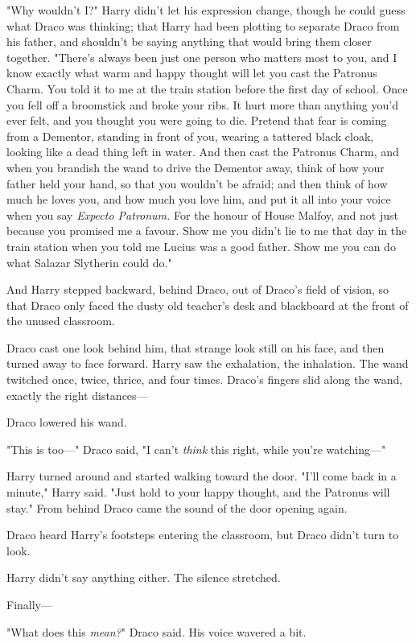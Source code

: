 "Why wouldn’t I?" Harry didn’t let his expression change, though he could guess
what Draco was thinking; that Harry had been plotting to separate Draco from
his father, and shouldn’t be saying anything that would bring them closer
together. "There’s always been just one person who matters most to you, and I
know exactly what warm and happy thought will let you cast the Patronus Charm.
You told it to me at the train station before the first day of school. Once you
fell off a broomstick and broke your ribs. It hurt more than anything you’d
ever felt, and you thought you were going to die. Pretend that fear is coming
from a Dementor, standing in front of you, wearing a tattered black cloak,
looking like a dead thing left in water. And then cast the Patronus Charm, and
when you brandish the wand to drive the Dementor away, think of how your father
held your hand, so that you wouldn’t be afraid; and then think of how much he
loves you, and how much you love him, and put it all into your voice when you
say \emph{Expecto Patronum.} For the honour of House Malfoy, and not just
because you promised me a favour. Show me you didn’t lie to me that day in the
train station when you told me Lucius was a good father. Show me you can do
what Salazar Slytherin could do."

And Harry stepped backward, behind Draco, out of Draco’s field of vision, so
that Draco only faced the dusty old teacher’s desk and blackboard at the front
of the unused classroom.

Draco cast one look behind him, that strange look still on his face, and then
turned away to face forward. Harry saw the exhalation, the inhalation. The wand
twitched once, twice, thrice, and four times. Draco’s fingers slid along the
wand, exactly the right distances—

Draco lowered his wand.

"This is too—" Draco said, "I can’t \emph{think} this right, while you’re
watching—"

Harry turned around and started walking toward the door. "I’ll come back in a
minute," Harry said. "Just hold to your happy thought, and the Patronus will
stay."
\later
From behind Draco came the sound of the door opening again.

Draco heard Harry’s footsteps entering the classroom, but Draco didn’t turn to
look.

Harry didn’t say anything either. The silence stretched.

Finally—

"What does this \emph{mean?}" Draco said. His voice wavered a bit.

